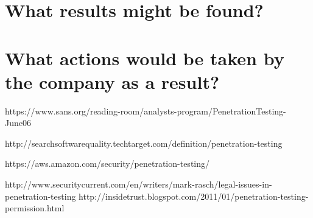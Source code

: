 \documentclass{article}
\begin{document}
\section{What results might be found? }

\section{What actions would be taken by the company as a result?}

\begin{thebibliography}{1}
     https://www.sans.org/reading-room/analysts-program/PenetrationTesting-June06

        http://searchsoftwarequality.techtarget.com/definition/penetration-testing

     https://aws.amazon.com/security/penetration-testing/

        http://www.securitycurrent.com/en/writers/mark-rasch/legal-issues-in-penetration-testing
     http://insidetrust.blogspot.com/2011/01/penetration-testing-permission.html
\end{thebibliography}
\end{document}
